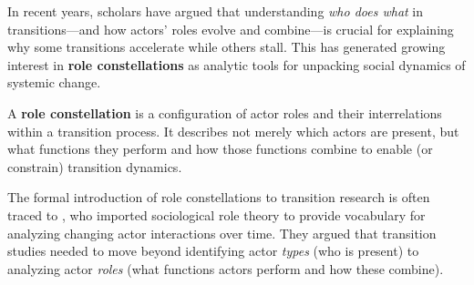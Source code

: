 \documentclass[../main.tex]{subfiles}
\begin{document}
In recent years, scholars have argued that understanding \emph{who does what} in transitions---and how actors' roles evolve and combine---is crucial for explaining why some transitions accelerate while others stall. This has generated growing interest in \textbf{role constellations} as analytic tools for unpacking social dynamics of systemic change.

\begin{roledef}
A \textbf{role constellation} is a configuration of actor roles and their interrelations within a transition process. It describes not merely which actors are present, but what functions they perform and how those functions combine to enable (or constrain) transition dynamics.
\end{roledef}

The formal introduction of role constellations to transition research is often traced to \textcite{wittmayer2017roles}, who imported sociological role theory to provide vocabulary for analyzing changing actor interactions over time. They argued that transition studies needed to move beyond identifying actor \emph{types} (who is present) to analyzing actor \emph{roles} (what functions actors perform and how these combine).
\end{document}
